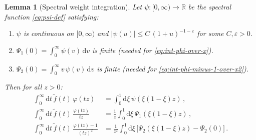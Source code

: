 \documentclass[11pt,a4paper]{article}
\renewcommand{\dd}{\mathrm{d}}
\newtheorem{lemma}[theorem]{Lemma}
\theoremstyle{definition}
\theoremstyle{remark}
\begin{document}
\begin{lemma}[Spectral weight integration]
\label{lem:spectral-int}
Let $\psi\colon [0,\infty) \to \mathbb{R}$ be the spectral function
\eqref{eq:psi-def} satisfying:
\begin{enumerate}[label=\textup{(H\arabic*)},nosep]
\item\label{H1} $\psi$ is continuous on $[0,\infty)$ and
  $|\psi(u)| \le C\,(1+u)^{-1-\varepsilon}$ for some $C, \varepsilon > 0$.
\item\label{H2} $\Psi_1(0) = \int_0^\infty \psi(v)\,\dd v$ is finite
  \textup(needed for \eqref{eq:int-phi-over-x}\textup).
\item\label{H3} $\Psi_2(0) = \int_0^\infty v\,\psi(v)\,\dd v$ is finite
  \textup(needed for \eqref{eq:int-phi-minus-1-over-x2}\textup).
\end{enumerate}
Then for all $z > 0$:
\begin{align}
  \int_0^\infty \dd t\,\tilde{f}(t)\,\varphi(tz)
  &= \int_0^1 \dd\xi\,\psi(\xi(1-\xi)z)\,,
  \label{eq:int-phi}\\[4pt]
  \int_0^\infty \dd t\,\tilde{f}(t)\,\frac{\varphi(tz)}{tz}
  &= \frac{1}{z}\int_0^1 \dd\xi\,\Psi_1(\xi(1-\xi)z)\,,
  \label{eq:int-phi-over-x}\\[4pt]
  \int_0^\infty \dd t\,\tilde{f}(t)\,\frac{\varphi(tz)-1}{(tz)^2}
  &= \frac{1}{z^2}\int_0^1 \dd\xi\,\bigl[
  \Psi_2(\xi(1-\xi)z) - \Psi_2(0)\bigr]\,.
  \label{eq:int-phi-minus-1-over-x2}
\end{align}
\end{lemma}
\end{document}
